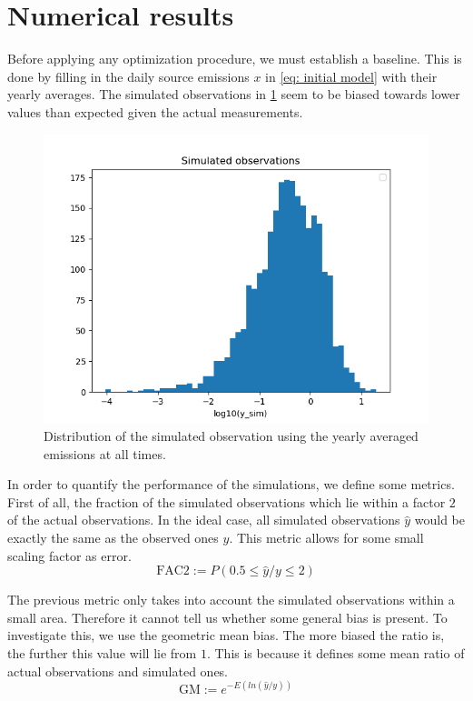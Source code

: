 \documentclass{article}
\begin{document}
\section{Numerical results}
\label{sec: numerical results}

Before applying any optimization procedure, we must establish a baseline. This is done by filling in the daily source emissions $x$ in \cref{eq: initial model} with their yearly averages. The simulated observations in \cref{fig: y-histogram baseline} seem to be biased towards lower values than expected given the actual measurements.\\


\begin{figure}
	\centering
	\includegraphics[width=0.5\linewidth]{../plots/original_simulated_observation.png}
	\caption{Distribution of the simulated observation using the yearly averaged emissions at all times.}
	\label{fig: y-histogram baseline}
\end{figure}


In order to quantify the performance of the simulations, we define some metrics. First of all, the fraction of the simulated observations which lie within a factor $2$ of the actual observations. In the ideal case, all simulated observations $\hat{y}$ would be exactly the same as the observed ones $y$. This metric allows for some small scaling factor as error.
\begin{equation}
	\text{FAC2}:=P(0.5\leq\hat{y}/y\leq 2)
\end{equation}

The previous metric only takes into account the simulated observations within a small area. Therefore it cannot tell us whether some general bias is present. To investigate this, we use the geometric mean bias. The more biased the ratio is, the further this value will lie from $1$. This is because it defines some mean ratio of actual observations and simulated ones.
\begin{equation}
	\text{GM}:=e^{-E(ln(\hat{y}/y))}
\end{equation}
\end{document}
